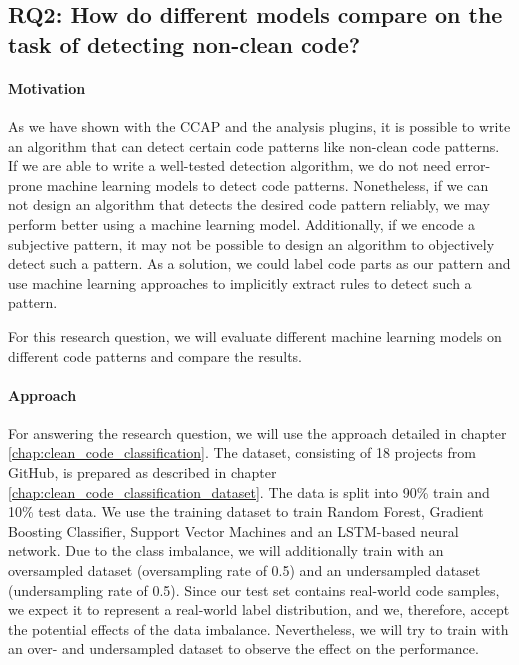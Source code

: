 \subsection{RQ2: How do different models compare on the task of detecting non-clean code?}
\paragraph{Motivation}
As we have shown with the CCAP and the analysis plugins, it is possible to write an algorithm that can detect certain code patterns like non-clean code patterns. If we are able to write a well-tested detection algorithm, we do not need error-prone machine learning models to detect code patterns. Nonetheless, if we can not design an algorithm that detects the desired code pattern reliably, we may perform better using a machine learning model. Additionally, if we encode a subjective pattern, it may not be possible to design an algorithm to objectively detect such a pattern. As a solution, we could label code parts as our pattern and use machine learning approaches to implicitly extract rules to detect such a pattern.

For this research question, we will evaluate different machine learning models on different code patterns and compare the results.

\paragraph{Approach}
For answering the research question, we will use the approach detailed in chapter \ref{chap:clean_code_classification}.  The dataset, consisting of 18 projects from GitHub, is prepared as described in chapter \ref{chap:clean_code_classification_dataset}. The data is split into 90\% train and 10\% test data. We use the training dataset to train Random Forest, Gradient Boosting Classifier, Support Vector Machines and an LSTM-based neural network. Due to the class imbalance, we will additionally train with an oversampled dataset (oversampling rate of 0.5) and an undersampled dataset (undersampling rate of 0.5). Since our test set contains real-world code samples, we expect it to represent a real-world label distribution, and we, therefore, accept the potential effects of the data imbalance. Nevertheless, we will try to train with an over- and undersampled dataset to observe the effect on the performance.

